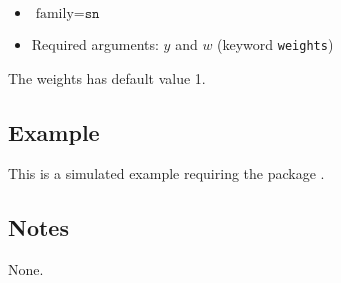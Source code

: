 \documentclass[a4paper,11pt]{article}
\begin{document}
\begin{itemize}
\item $\text{family}=\texttt{sn}$
\item Required arguments: $y$ and $w$ (keyword \texttt{weights})
\end{itemize}
The weights has default value 1.

\subsection*{Example}

This is a simulated example requiring the package \verb@sn@.


\subsection*{Notes}

None.
\end{document}
